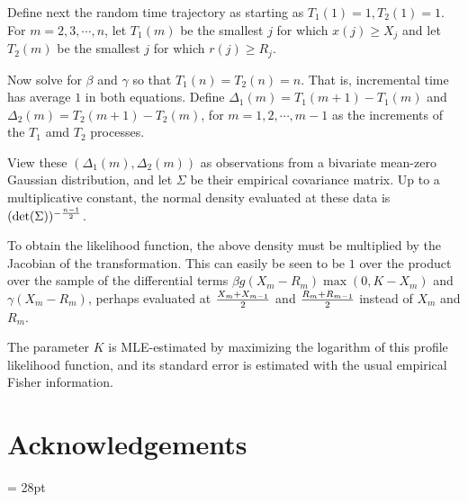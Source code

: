 \documentclass{article}
\begin{document}
Define next the random time trajectory as starting as $T_1(1)=1, T_2(1)=1$. For $m=2,3,\cdots,n$, let $T_1(m)$ be the smallest $j$ for which $x(j) \ge X_j$ and let $T_2(m)$ be the smallest $j$ for which $r(j) \ge R_j$.

Now solve for $\beta$ and $\gamma$ so that $T_1(n)=T_2(n)=n$. That is, incremental time has average $1$ in both equations. Define $\Delta_1(m)=T_1(m+1)-T_1(m)$ and $\Delta_2(m)=T_2(m+1)-T_2(m)$, for $m=1, 2, \cdots,m-1$ as the increments of the $T_1$ amd $T_2$ processes.

View these $(\Delta_1(m),\Delta_2(m))$ as observations from a bivariate mean-zero Gaussian distribution, and let $\Sigma$ be their empirical covariance matrix. Up to a multiplicative constant, the normal density evaluated at these data is $(\det(\Sigma))^{-{{n-1} \over 2}}$.

To obtain the likelihood function, the above density must be multiplied by the Jacobian of the transformation. This can easily be seen to be $1$ over the product over the sample of the differential terms $\beta g(X_m-R_m)\max(0,K-X_m)$ and $\gamma (X_m-R_m)$, perhaps evaluated at
${{X_m+X_{m-1}} \over 2}$ and ${{R_m+R_{m-1}} \over 2}$ instead of $X_m$ and $R_m$.

The parameter $K$ is MLE-estimated by maximizing the logarithm of this profile likelihood function, and its standard error is estimated with the usual empirical Fisher information.



    


 






\section*{Acknowledgements}

\baselineskip= 28pt

\begin{thebibliography}{99}
	
	
\end{thebibliography}
\end{document}
